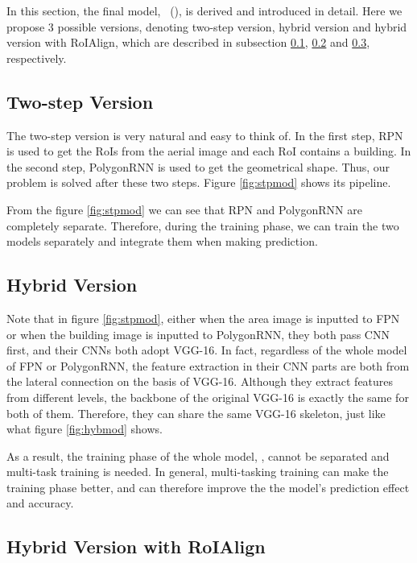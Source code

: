 In this section, the final model, \modelnameshort\ (\modelnamelong), is derived and introduced in detail. Here we propose 3 possible versions, denoting two-step version, hybrid version and hybrid version with RoIAlign, which are described in subsection \ref{stpmod}, \ref{hybmod} and \ref{algmod}, respectively.

\subsection{Two-step Version}\label{stpmod}

The two-step version is very natural and easy to think of. In the first step, RPN is used to get the RoIs from the aerial image and each RoI contains a building. In the second step, PolygonRNN is used to get the geometrical shape. Thus, our problem is solved after these two steps. Figure \ref{fig:stpmod} shows its pipeline.



From the figure \ref{fig:stpmod} we can see that RPN and PolygonRNN are completely separate. Therefore, during the training phase, we can train the two models separately and integrate them when making prediction.

\subsection{Hybrid Version}\label{hybmod}

Note that in figure \ref{fig:stpmod}, either when the area image is inputted to FPN or when the building image is inputted to PolygonRNN, they both pass CNN first, and their CNNs both adopt VGG-16. In fact, regardless of the whole model of FPN or PolygonRNN, the feature extraction in their CNN parts are both from the lateral connection on the basis of VGG-16. Although they extract features from different levels, the backbone of the original VGG-16 is exactly the same for both of them. Therefore, they can share the same VGG-16 skeleton, just like what figure \ref{fig:hybmod} shows.



As a result, the training phase of the whole model, \modelnameshort, cannot be separated and multi-task training is needed. In general, multi-tasking training can make the training phase better, and can therefore improve the the model's prediction effect and accuracy.

\subsection{Hybrid Version with RoIAlign}\label{algmod}

